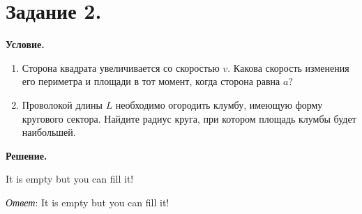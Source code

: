 \section{Задание 2.}

\textbf{Условие.}\\
\begin{enumerate}
    \item Сторона квадрата увеличивается со скоростью $v$.
    Какова скорость изменения его периметра и площади в тот момент, когда сторона равна $a$?
    \item Проволокой длины $L$ необходимо огородить клумбу, имеющую форму кругового сектора.
    Найдите радиус круга, при котором площадь клумбы будет наибольшей.
\end{enumerate}
\vspace{10mm}
\textbf{Решение.}

It is empty but you can fill it!

\textit{Ответ}: It is empty but you can fill it!
\clearpage
